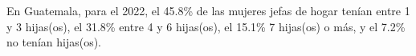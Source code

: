En Guatemala, para el 2022, el 45.8\% de las mujeres jefas de hogar tenían entre 1 y 3 hijas(os), el 31.8\% entre 4 y 6 hijas(os), el 15.1\% 7 hijas(os) o más, y el 7.2\% no tenían hijas(os). 